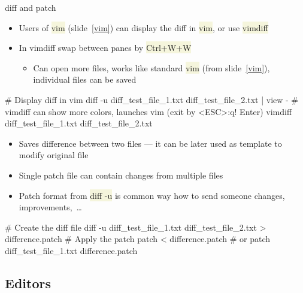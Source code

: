 \documentclass[compress, ucs, xelatex, 11pt, xcolor=svgnames, aspectratio=169,
	hyperref={
		bookmarks=true,
		unicode=true,
		colorlinks=true,
		pdftitle={Linux, command line and MetaCentrum},
		plainpages=false,
		pdfauthor={Vojtech Zeisek},
		pdfsubject={Course about use of Linux command line, writing shell scripts and using MetaCentrum of CESNET},
		pdfcreator={XeLaTeX},
		pdfkeywords={Linux, GNU, BASH, shell, command line, MetaCentrum},
		linkcolor=DarkRed, %
		anchorcolor=DarkBlue, %
		citecolor=Indigo, %
		filecolor=NavyBlue, %
		menucolor=DarkMagenta, %
		urlcolor=DarkBlue, %
		pdftex},
	url={hyphens, lowtilde} %
	]{beamer}
\renewcommand{\texttt}[1]{\colorbox{Beige}{{\ttfamily #1}}}
\begin{document}
\begin{frame}[fragile]{diff and patch}
	\begin{itemize}
		\item Users of \texttt{vim} (slide~\ref{vim}) can display the diff in \texttt{vim}, or use \texttt{vimdiff}
		\item In vimdiff swap between panes by \texttt{Ctrl+W+W}
		\begin{itemize}
			\item Can open more files, works like standard \texttt{vim} (from slide~\ref{vim}), individual files can be saved
		\end{itemize}
	\end{itemize}
	\vfill
	\begin{bashcode}
    # Display diff in vim
    diff -u diff_test_file_1.txt diff_test_file_2.txt | view -
    # vimdiff can show more colors, launches vim (exit by <ESC>:q! Enter)
    vimdiff diff_test_file_1.txt diff_test_file_2.txt
	\end{bashcode}
	\vfill
	\begin{itemize}
		\item Saves difference between two files --- it can be later used as template to modify original file
		\item Single patch file can contain changes from multiple files
		\item Patch format from \texttt{diff -u} is common way how to send someone changes, improvements,~\ldots
	\end{itemize}
	\vfill
	\begin{bashcode}
    # Create the diff file
    diff -u diff_test_file_1.txt diff_test_file_2.txt > difference.patch
    # Apply the patch
    patch < difference.patch # or
    patch diff_test_file_1.txt difference.patch
	\end{bashcode}
\end{frame}

\subsection{Editors}
\end{document}

